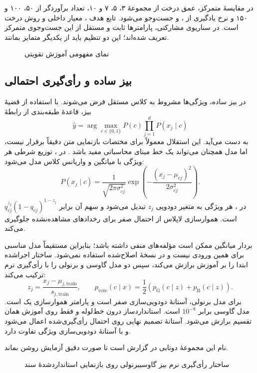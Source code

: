 در مقایسۀ متمرکز، عمق درخت از مجموعۀ ۳، ۵، ۷ و ۱۰، تعداد برآوردگر از ۵۰، ۱۰۰ و ۱۵۰ و نرخ یادگیری از ،  و  جست‌وجو می‌شود. تابع هدف ، معیار داخلی  و روش درخت  است. در سناریوی مشارکتی، پارامترها ثابت و مستقل از این جست‌وجوی متمرکز تعریف شده‌اند؛ این دو تنظیم باید از یکدیگر متمایز بمانند.
\begin{figure}[htbp]
\centering
\caption{نمای مفهومی آموزش تقویتی }
\label{fig:xgb-flow}
\end{figure}

\subsection{بیز ساده و رأی‌گیری احتمالی}
در بیز ساده، ویژگی‌ها مشروط به کلاس مستقل فرض می‌شوند. با استفاده از قضیۀ بیز، قاعدۀ طبقه‌بندی از رابطۀ
\begin{equation}
\widehat y=\arg\max_{c\in\{0,1\}}P(c)\prod_{j=1}^{d}P(x_j\mid c)
\end{equation}
به دست می‌آید. این استقلال معمولاً برای مختصات بازنمایی متن دقیقاً برقرار نیست، اما مدل همچنان می‌تواند یک خط مبنای محاسباتی مفید باشد \cite{ref112,ref142,ref176}. در ، توزیع شرطی هر ویژگی با میانگین و واریانس کلاس مدل می‌شود:
\begin{equation}
P(x_j\mid c)=\frac{1}{\sqrt{2\pi\sigma_{cj}^{2}}}
\exp\!\left(-\frac{(x_j-\mu_{cj})^2}{2\sigma_{cj}^{2}}\right).
\end{equation}
در ، هر ویژگی به متغیر دودویی $z_j$ تبدیل می‌شود و سهم آن برابر $q_{cj}^{z_j}(1-q_{cj})^{1-z_j}$ است. هموارسازی لاپلاس از احتمال صفر برای رخدادهای مشاهده‌نشده جلوگیری می‌کند.

بردار میانگین  ممکن است مؤلفه‌های منفی داشته باشد؛ بنابراین  مستقیماً مدل مناسبی برای همین ورودی نیست و در نسخۀ اصلاح‌شده استفاده نمی‌شود. ساختار اجراشده ابتدا  را بر آموزش برازش می‌کند، سپس دو مدل گاوسی و برنولی را با رأی‌گیری نرم ترکیب می‌کند:
\begin{equation}
z_j=\frac{x_j-\mu_{j,\mathrm{train}}}{s_{j,\mathrm{train}}},\qquad
p_{\mathrm{vote}}(c\mid x)=\frac12\left(p_{\mathrm G}(c\mid z)+p_{\mathrm B}(c\mid z)\right).
\end{equation}
برای مدل برنولی، آستانۀ دودویی‌سازی صفر است و پارامتر هموارسازی یک است.  مدل گاوسی برابر $10^{-8}$ است. استانداردساز درون خط‌لوله و فقط روی آموزش همان تقسیم برازش می‌شود. آستانۀ تصمیم نهایی روی احتمال رأی‌گیری‌شده اعمال می‌شود و با آستانۀ دودویی‌سازی ویژگی تفاوت دارد.

نام این مجموعۀ دوتایی در گزارش  است تا صورت دقیق آزمایش روشن بماند.
\begin{figure}[htbp]
\centering
\caption{ساختار رأی‌گیری نرم بیز گاوسی\lr{--}برنولی روی بازنمایی استانداردشدۀ سند}
\label{fig:bayes-model}
\end{figure}
